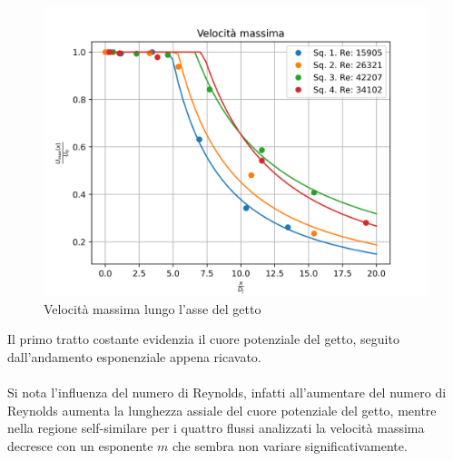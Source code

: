 \begin{figure}[h]
    \centering
    \includegraphics[width=.9\textwidth]{images/4/umax.png}
    \caption{Velocità massima lungo l'asse del getto}
\end{figure}

\noindent Il primo tratto costante evidenzia il cuore potenziale del getto, seguito dall'andamento esponenziale appena ricavato.\\\\
Si nota l'influenza del numero di Reynolds, infatti all'aumentare del numero di Reynolds aumenta la lunghezza assiale del cuore potenziale del getto, mentre nella regione self-similare per i quattro flussi analizzati la velocità massima decresce con un esponente $m$ che sembra non variare significativamente.

